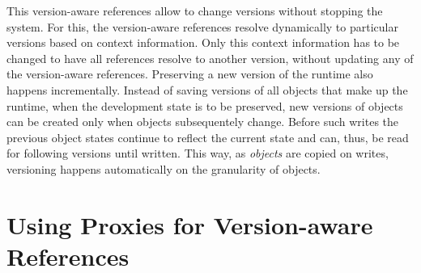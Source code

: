 This version-aware references allow to change versions without stopping the system.
For this, the version-aware references resolve dynamically to particular versions based on context information.
Only this context information has to be changed to have all references resolve to another version, without updating any of the version-aware references.
Preserving a new version of the runtime also happens incrementally.
Instead of saving versions of all objects that make up the runtime, when the development state is to be preserved, new versions of objects can be created only when objects subsequentely change.
Before such writes the previous object states continue to reflect the current state and can, thus, be read for following versions until written.
This way, as \emph{objects} are copied on writes, versioning happens automatically on the granularity of objects.






% 









\section{Using Proxies for Version-aware References} \label{sec:APPROACH:2}




